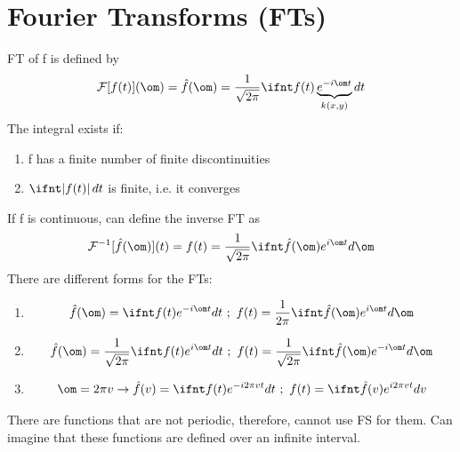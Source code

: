 \documentclass[a4paper, 11pt, normalem]{report}
\begin{document}
\section{Fourier Transforms (FTs)}
FT of f is defined by
\begin{equation*}
    \mathcal{F}[f(t)](\om) = \hat{f}(\om) = \frac{1}{\sqrt{2\pi}}\ifnt f(t)\underbrace{e^{-i\om t}}_{k(x,y)}dt
\end{equation*}
The integral exists if:
\begin{enumerate}
    \item f has a finite number of finite discontinuities
    \item $\ifnt |f(t)|\,dt$ is finite, i.e. it converges
\end{enumerate}
If f is continuous, can define the inverse FT as
\begin{equation*}
    \mathcal{F}^{-1}[\hat{f}(\om)](t) = f(t) = \frac{1}{\sqrt{2\pi}} \ifnt \hat{f}(\om) e^{i\om t}d\om
\end{equation*}
There are different forms for the FTs:
\begin{enumerate}
    \item   \begin{equation*}
                \hat{f}(\om) = \ifnt f(t)e^{-i\om t}dt ~;~ f(t) = \frac{1}{2\pi} \ifnt \hat{f}(\om)e^{i\om t}d\om
            \end{equation*}
    \item   \begin{equation*}
                \hat{f}(\om) = \frac{1}{\sqrt{2\pi}} \ifnt f(t)e^{i\om t}dt ~;~ f(t) = \frac{1}{\sqrt{2\pi}} \ifnt \hat{f}(\om)e^{-i\om t}d\om
            \end{equation*}
    \item   \begin{equation*}
                \om = 2\pi v \to \hat{f}(v) = \ifnt f(t)e^{-i2\pi vt}dt ~;~ f(t) = \ifnt \hat{f}(v) e^{i2\pi vt}dv
            \end{equation*}
\end{enumerate}
There are functions that are not periodic, therefore, cannot use FS for them. Can imagine that these functions are defined over an infinite interval.
\end{document}
